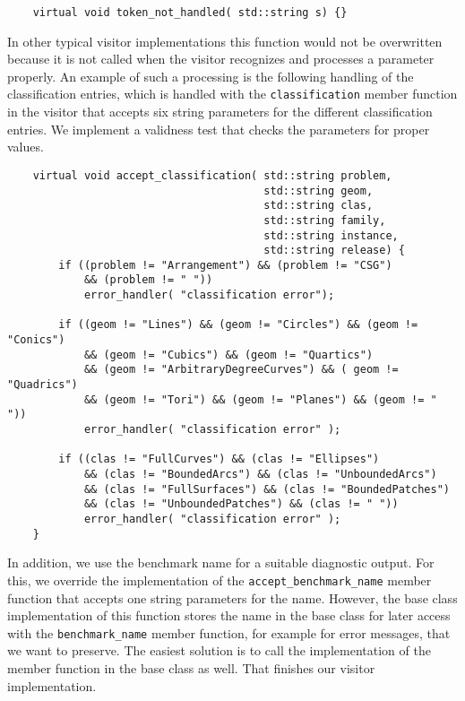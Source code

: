 \begin{verbatim}
    virtual void token_not_handled( std::string s) {}
\end{verbatim}

\noindent
In other typical visitor implementations this function would not be
overwritten because it is not called when the visitor recognizes and
processes a parameter properly. An example of such a processing is the
following handling of the  classification entries, which is handled
with the \texttt{classification} member function in the visitor that
accepts six string parameters for the different classification
entries. We implement a validness test that checks the parameters for
proper values.

\begin{verbatim}
    virtual void accept_classification( std::string problem,
                                        std::string geom, 
                                        std::string clas,
                                        std::string family,
                                        std::string instance,
                                        std::string release) {
        if ((problem != "Arrangement") && (problem != "CSG") 
            && (problem != " "))
            error_handler( "classification error");

        if ((geom != "Lines") && (geom != "Circles") && (geom != "Conics") 
            && (geom != "Cubics") && (geom != "Quartics") 
            && (geom != "ArbitraryDegreeCurves") && ( geom != "Quadrics") 
            && (geom != "Tori") && (geom != "Planes") && (geom != " "))
            error_handler( "classification error" );

        if ((clas != "FullCurves") && (clas != "Ellipses") 
            && (clas != "BoundedArcs") && (clas != "UnboundedArcs") 
            && (clas != "FullSurfaces") && (clas != "BoundedPatches")
            && (clas != "UnboundedPatches") && (clas != " "))
            error_handler( "classification error" );
    }
\end{verbatim}

\noindent
In addition, we use the benchmark name for a suitable diagnostic
output. For this, we override the implementation of the
\texttt{accept\_benchmark\_name} member function that accepts one
string parameters for the name. However, the base class implementation
of this function stores the name in the base class for later access
with the \texttt{benchmark\_name} member function, for example for
error messages, that we want to preserve. The easiest solution is to
call the implementation of the member function in the base class as
well. That finishes our visitor implementation.

